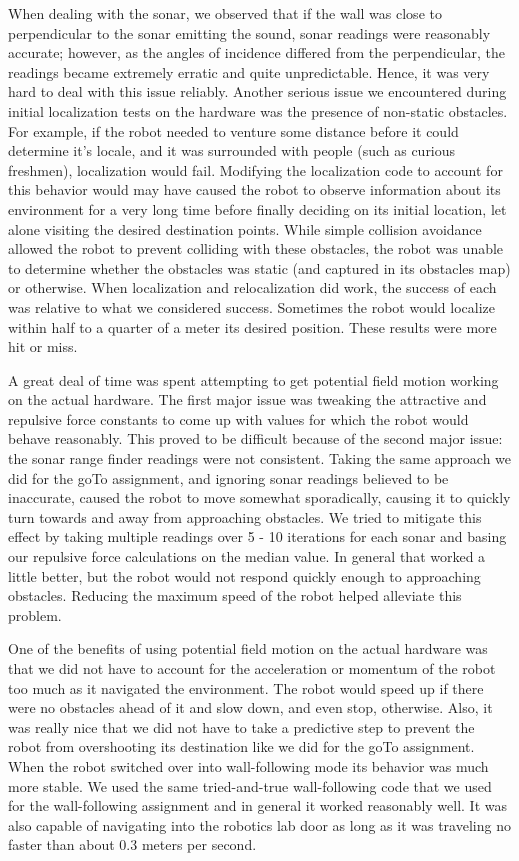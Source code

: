 \documentclass[12pt]{article}
\begin{document}
When dealing with the sonar, we observed that if the wall was close to perpendicular to the sonar emitting the sound, sonar readings were reasonably accurate; however, as the angles of incidence differed from the perpendicular, the readings became extremely erratic and quite unpredictable. Hence, it was very hard to deal with this issue reliably. Another serious issue we encountered during initial localization tests on the hardware was the presence of non-static obstacles. For example, if the robot needed to venture some distance before it could determine it's locale, and it was surrounded with people (such as curious freshmen), localization would fail. Modifying the localization code to account for this behavior would may have caused the robot to observe information about its environment for a very long time before finally deciding on its initial location, let alone visiting the desired destination points. While simple collision avoidance allowed the robot to prevent colliding with these obstacles, the robot was unable to determine whether the obstacles was static (and captured in its obstacles map) or otherwise. When localization and relocalization did work, the success of each was relative to what we considered success. Sometimes the robot would localize within half to a quarter of a meter its desired position.  These results were more hit or miss.

A great deal of time was spent attempting to get potential field motion working on the actual hardware. The first major issue was tweaking the attractive and repulsive force constants to come up with values for which the robot would behave reasonably. This proved to be difficult because of the second major issue: the sonar range finder readings were not consistent. Taking the same approach we did for the goTo assignment, and ignoring sonar readings believed to be inaccurate, caused the robot to move somewhat sporadically, causing it to quickly turn towards and away from approaching obstacles. We tried to mitigate this effect by taking multiple readings over 5 - 10 iterations for each sonar and basing our repulsive force calculations on the median value. In general that worked a little better, but the robot would not respond quickly enough to approaching obstacles. Reducing the maximum speed of the robot helped alleviate this problem.

One of the benefits of using potential field motion on the actual hardware was that we did not have to account for the acceleration or momentum of the robot too much as it navigated the environment. The robot would speed up if there were no obstacles ahead of it and slow down, and even stop, otherwise. Also, it was really nice that we did not have to take a predictive step to prevent the robot from overshooting its destination like we did for the goTo assignment. When the robot switched over into wall-following mode its behavior was much more stable. We used the same tried-and-true wall-following code that we used for the wall-following assignment and in general it worked reasonably well. It was also capable of navigating into the robotics lab door as long as it was traveling no faster than about 0.3 meters per second.
\end{document}
